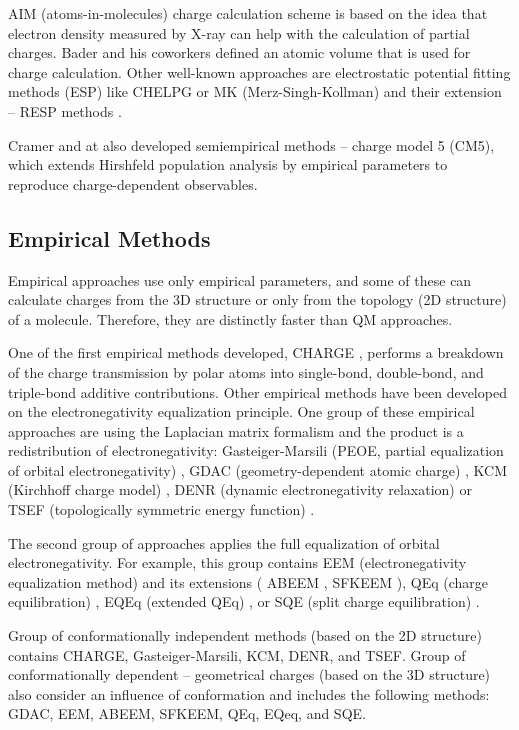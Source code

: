 AIM (atoms-in-molecules) charge calculation scheme is based on the idea that
electron density measured by X-ray can help with the calculation of partial
charges. Bader and his coworkers \cite{Bader1985, Bader1991} defined an atomic
volume that is used for charge calculation. Other well-known approaches are
electrostatic potential fitting methods (ESP) like CHELPG \cite{Breneman1990}
or MK (Merz-Singh-Kollman) \cite{Besler1990} and their extension -- RESP
methods \cite{Bayly1992}.

Cramer and at \cite{Marenich2009} also developed semiempirical methods -- charge
model 5 (CM5), which extends Hirshfeld population analysis by empirical
parameters to reproduce charge-dependent observables. 

\subsection{Empirical Methods}

Empirical approaches use only empirical parameters, and some of these can
calculate charges from the 3D structure or only from the topology (2D structure)
of a molecule. Therefore, they are distinctly faster than QM approaches. 

One of the first empirical methods developed, CHARGE \cite{Abraham2004}, performs a breakdown
of the charge transmission by polar atoms into single-bond, double-bond, and 
triple-bond additive contributions. Other empirical methods have been developed
on the electronegativity equalization principle. One group of these empirical
approaches are using the Laplacian matrix formalism and the product is
a redistribution of electronegativity: Gasteiger-Marsili (PEOE, partial
equalization of orbital electronegativity) \cite{Gasteiger1980},
GDAC (geometry-dependent atomic charge) \cite{Cho2001}, KCM (Kirchhoff charge
model) \cite{Oliferenko2006}, DENR (dynamic electronegativity
relaxation) \cite{Shulga2008} or TSEF (topologically symmetric energy
function) \cite{Shulga2008}.

The second group of approaches applies the full equalization of orbital
electronegativity. For example, this group contains EEM (electronegativity
equalization method) \cite{Mortier1986} and its extensions (
ABEEM \cite{Yang1997}, SFKEEM \cite{Chaves2006}), QEq (charge
equilibration) \cite{Rappe1991}, EQEq (extended QEq) \cite{Wilmer2012}, or
SQE (split charge equilibration) \cite{Nistor2006}.

Group of conformationally independent methods (based on the 2D structure)
contains CHARGE, Gasteiger-Marsili, KCM, DENR, and TSEF. Group of
conformationally dependent -- geometrical charges (based on the 3D structure)
also consider an influence of conformation and includes the following methods:
GDAC, EEM, ABEEM, SFKEEM, QEq, EQeq, and SQE.


